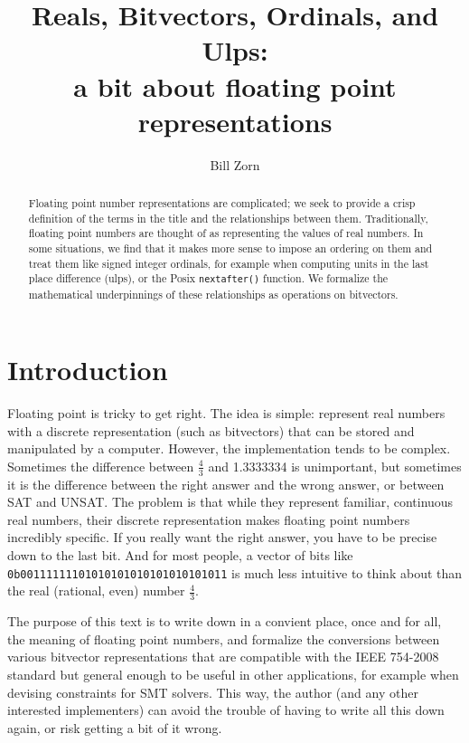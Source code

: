 \documentclass[letterpaper,10pt]{article}
\title{Reals, Bitvectors, Ordinals, and Ulps:\\a bit about floating point representations}
\author{Bill Zorn}
\begin{document}
\maketitle

\begin{abstract}
 Floating point number representations are complicated; we seek to provide a crisp definition of the terms in the title and the relationships between them. Traditionally, floating point numbers are thought of as representing the values of real numbers. In some situations, we find that it makes more sense to impose an ordering on them and treat them like signed integer ordinals, for example when computing units in the last place difference (ulps), or the Posix \texttt{nextafter()} function. We formalize the mathematical underpinnings of these relationships as operations on bitvectors.
\end{abstract}

\section{Introduction}

Floating point is tricky to get right. The idea is simple: represent real numbers with a discrete representation (such as bitvectors) that can be stored and manipulated by a computer. However, the implementation tends to be complex. Sometimes the difference between $\frac{4}{3}$ and 1.3333334 is unimportant, but sometimes it is the difference between the right answer and the wrong answer, or between SAT and UNSAT. The problem is that while they represent familiar, continuous real numbers, their discrete representation makes floating point numbers incredibly specific. If you really want the right answer, you have to be precise down to the last bit. And for most people, a vector of bits like \texttt{0b00111111101010101010101010101011} is much less intuitive to think about than the real (rational, even) number $\frac{4}{3}$.

The purpose of this text is to write down in a convient place, once and for all, the meaning of floating point numbers, and formalize the conversions between various bitvector representations that are compatible with the IEEE 754-2008 standard \cite{ieee754-2008} but general enough to be useful in other applications, for example when devising constraints for SMT solvers. This way, the author (and any other interested implementers) can avoid the trouble of having to write all this down again, or risk getting a bit of it wrong.
\end{document}
